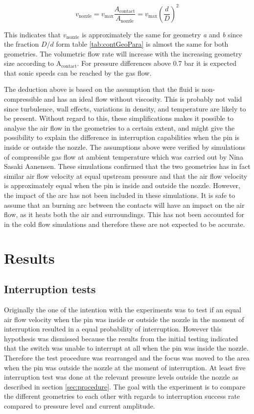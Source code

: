 \documentclass[10pt,a4paper,twoside]{article}
\begin{document}
\begin{equation} \label{eq:VolumetricFlow}
v_\mathrm{{nozzle}}= v_\mathrm{{max}}\frac{A_\mathrm{{contact}}}{A_\mathrm{{nozzle}} }= v_\mathrm{{max}} \left(\frac{d}{D}\right)^2
\end{equation} 

This indicates that $v_\mathrm{{nozzle}}$ is approximately the same for geometry \textit{a} and \textit{b} since the fraction $D/d$ form table \ref{tab:contGeoPara} is almost the same for both geometries. The volumetric flow rate will increase with the increasing geometry size according to A$_\mathrm{{contact}}$. For pressure differences above 0.7 bar it is expected that sonic speeds can be reached by the gas flow.

The deduction above is based on the assumption that the fluid is non-compressible and has an ideal flow without viscosity. This is probably not valid since turbulence, wall effects, variations in density, and temperature are likely to be present. Without regard to this, these simplifications makes it possible to analyse the air flow in the geometries to a certain extent, and might give the possibility to explain the difference in interruption capabilities when the pin is inside or outside the nozzle. The assumptions above were verified by simulations of compressible gas flow at ambient temperature which was carried out by Nina Sasaki Aanensen. These simulations confirmed that the two geometries has in fact similar air flow velocity at equal upstream pressure and that the air flow velocity is approximately equal when the pin is inside and outside the nozzle. However, the impact of the arc has not been included in these simulations. It is safe to assume that an burning arc between the contacts will have an impact on the air flow, as it heats both the air and surroundings. This has not been accounted for in the cold flow simulations and therefore these are not expected to be accurate.

\cleardoublepage

\section{Results}
\subsection{Interruption tests} \label{sec:interChance}
Originally the one of the intention with the experiments was to test if an equal air flow velocity when the pin was inside or outside the nozzle in the moment of interruption resulted in a equal probability of interruption. However this hypothesis was dismissed because the results from the initial testing indicated that the switch was unable to interrupt at all when the pin was inside the nozzle. Therefore the test procedure was rearranged and the focus was moved to the area when the pin was outside the nozzle at the moment of interruption. At least five interruption test was done at the relevant pressure levels outside the nozzle as described in section \ref{sec:procedure}. The goal with the experiment is to compare the different geometries to each other with regards to interruption success rate compared to pressure level and current amplitude.
\end{document}
